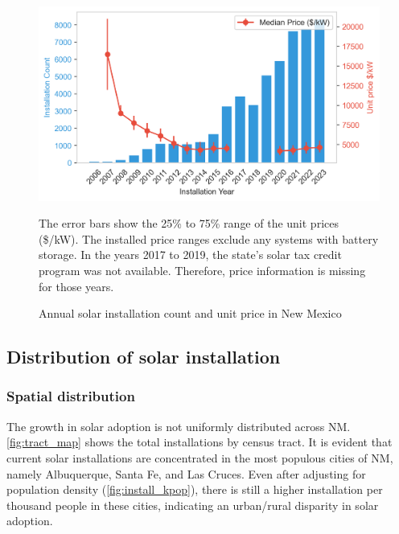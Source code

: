\documentclass[11pt,twoside,letterpaper]{article}
\begin{document}
\begin{figure}[H]
    \centering
\includegraphics[width=1\textwidth]{figures/installation_count_price.png}
    \caption{Annual solar installation count and unit price in New Mexico}
    \label{fig:installation_count}
    \begin{flushleft}
        \footnotesize The error bars show the 25\% to 75\% range of the unit prices (\$/kW). The installed price ranges exclude any systems with battery storage. In the years 2017 to 2019, the state’s solar tax credit program was not available. Therefore, price information is missing for those years.
    \end{flushleft}
\end{figure}

\subsection{Distribution of solar installation}

\subsubsection{Spatial distribution}
\label{subsec:Spatial distribution}

The growth in solar adoption is not uniformly distributed across NM. \autoref{fig:tract_map} shows the total installations by census tract. It is evident that current solar installations are concentrated in the most populous cities of NM, namely Albuquerque, Santa Fe, and Las Cruces. Even after adjusting for population density (\autoref{fig:install_kpop}), there is still a higher installation per thousand people in these cities, indicating an urban/rural disparity in solar adoption.
\end{document}
